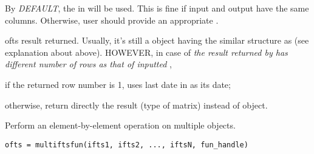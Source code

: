 \begin{argdesc}
                 By \emph{DEFAULT}, 
                 the  in  will be used.
                 This is fine if input and output have the same columns.
                 Otherwise,
                 user should provide an appropriate .
          \item[ofts] result returned. 
                 Usually, it's still a \myfints{} object
                 having the similar structure as 
                 (see explanation about  above). 
                 HOWEVER, in case of 
                 \textit{the result returned by  has different number
                 of rows as that of inputted },
                    \begin{itemize*}
                    \item if the returned row number is 1, 
                           uses last date in  as its date; 
                    \item  otherwise, return directly the result (type of matrix)
                           instead of \myfints{} object.
                    \end{itemize*}
      \end{argdesc}


   Perform an element-by-element operation on multiple \myfints{} objects.

\usage
   \begin{lstlisting}[numbers=none]
   ofts = multiftsfun(ifts1, ifts2, ..., iftsN, fun_handle)
   \end{lstlisting}

